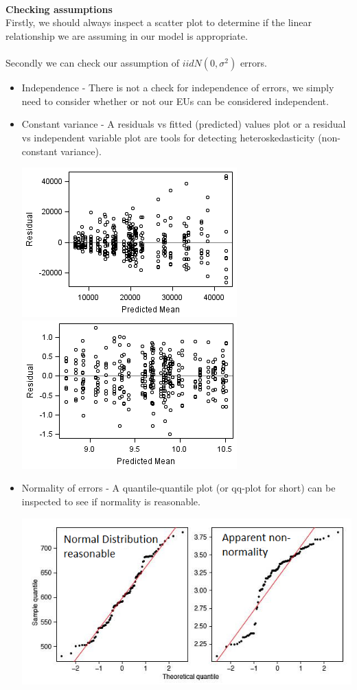 ~\\~\\~\\
\textbf{Checking assumptions}\\
Firstly, we should always inspect a scatter plot to determine if the linear relationship we are assuming in our model is appropriate.\\~\\
Secondly we can check our assumption of $iid N(0,\sigma^2)$ errors.  
\begin{itemize}
\item Independence - There is not a check for independence of errors,  we simply need to consider whether or not our EUs can be considered independent. 
\item Constant variance - A residuals vs fitted (predicted) values plot or a residual vs independent variable plot are tools for detecting heteroskedasticity (non-constant variance).  
\begin{center}
\includegraphics{hetero}\includegraphics{homo}
\end{center}
\item Normality of errors - A quantile-quantile plot (or qq-plot for short) can be inspected to see if normality is reasonable.
\begin{center}
\includegraphics[scale=0.5]{qq}
\end{center}
\end{itemize}

